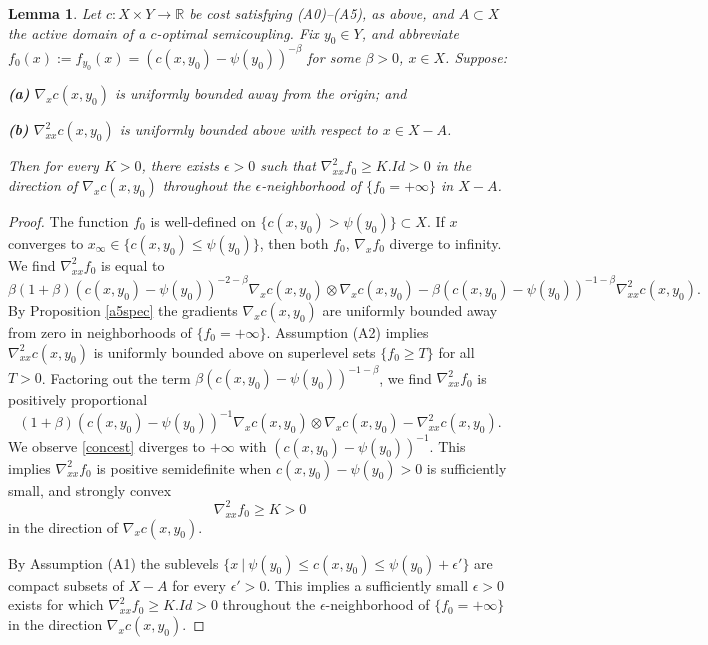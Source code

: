 \documentclass[12pt]{amsart}
\newtheorem{lem}{Lemma}
\theoremstyle{definition}
\theoremstyle{remark}
\newcommand{\bR}{\mathbb{R}}
\begin{document}

\begin{lem}\label{conc} 
Let $c: X\times Y \to \bR$ be cost satisfying (A0)--(A5), as above, and $A\subset X$ the active domain of a $c$-optimal semicoupling. Fix $y_0\in Y$, and abbreviate $f_0(x):=f_{y_0}(x)=(c(x,y_0)-\psi(y_0))^{-\beta}$ for some $\beta>0$, $x\in X$. 
Suppose:

\textbf{(a)} $\nabla_x c(x,y_0)$ is uniformly bounded away from the origin; and

\textbf{(b)}  $\nabla^2_{xx} c(x,y_0)$ is uniformly bounded above with respect to $x\in X-A$.

Then for every $K>0$, there exists $\epsilon>0$ such that $\nabla_{xx}^2 f_0\geq K.Id>0$ in the direction of $\nabla_x c(x,y_0)$ throughout the $\epsilon$-neighborhood of $\{f_0=+\infty\}$ in $X-A$.


\end{lem}
\begin{proof}
The function $f_0$ is well-defined on $\{c(x,y_0)>\psi(y_0)\} \subset X$. If $x$ converges to $x_\infty \in \{c(x,y_0) \leq \psi(y_0)\}$, then both $f_0$, $\nabla_x f_0$ diverge to infinity.  We find $\nabla^2_{xx} f_0$ is equal to $$\beta(1+\beta) (c(x,y_0)-\psi(y_0))^{-2-\beta} \nabla_x c(x,y_0) \otimes \nabla_x c(x,y_0)-\beta (c(x,y_0)-\psi(y_0))^{-1-\beta} \nabla^2_{xx} c(x,y_0).$$ By Proposition \ref{a5spec} the gradients $\nabla_x c(x,y_0)$ are uniformly bounded away from zero in neighborhoods of $\{f_0=+\infty\}$. Assumption (A2) implies $\nabla^2_{xx} c(x,y_0)$ is uniformly bounded above on superlevel sets $\{f_0 \geq T\}$ for all $T>0$. Factoring out the term $\beta (c(x,y_0)-\psi(y_0))^{-1-\beta}$, we find $\nabla_{xx}^2 f_0$ is positively proportional \begin{equation}\label{concest} (1+\beta)(c(x,y_0)-\psi(y_0))^{-1} \nabla_x c(x,y_0) \otimes \nabla_x c(x,y_0) - \nabla_{xx}^2 c(x,y_0).\end{equation} We observe \eqref{concest} diverges to $+\infty$ with $(c(x,y_0)-\psi(y_0))^{-1}$. This implies $\nabla^2_{xx} f_0$ is positive semidefinite when $c(x,y_0)-\psi(y_0)>0$ is sufficiently small, and strongly convex $$\nabla_{xx}^2 f_0 \geq K >0$$ in the direction of $\nabla_x c(x,y_0)$. 

By Assumption (A1) the sublevels $\{x ~|~\psi(y_0)\leq c(x,y_0) \leq \psi(y_0)+\epsilon'\}$ are compact subsets of $X-A$ for every $\epsilon'>0$. This implies a sufficiently small $\epsilon>0$ exists for which $\nabla^2_{xx} f_0\geq K.Id>0$ throughout the $\epsilon$-neighborhood of $\{f_0=+\infty\}$ in the direction $\nabla_x c(x,y_0)$. 
\end{proof}
\end{document}

